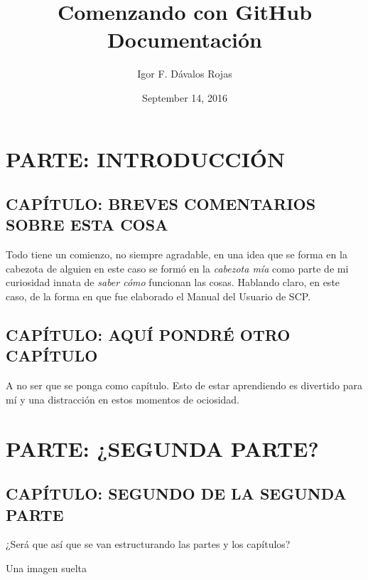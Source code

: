 \documentclass[letterpaper,10pt,english]{sphinxmanual}
\title{Comenzando con GitHub Documentación}
\date{September 14, 2016}
\author{Igor F. Dávalos Rojas}
\begin{document}
\maketitle
\tableofcontents
{}\label{index::doc}



\part{PARTE: INTRODUCCIÓN}
\label{introduccion:introduccion}\label{introduccion:parte-introduccion}\label{introduccion:welcome-to-comenzando-con-github-s-documentation}\label{introduccion::doc}

\chapter{CAPÍTULO: BREVES COMENTARIOS SOBRE ESTA COSA}
\label{introduccion:capitulo-breves-comentarios-sobre-esta-cosa}\label{introduccion:capitulo1}
Todo tiene un comienzo, no siempre agradable, en una idea que se forma en la cabezota de alguien
en este caso se formó en la \emph{cabezota mía} como parte de mi curiosidad innata de \emph{saber cómo} funcionan las cosas.
Hablando claro, en este caso, de la forma en que fue elaborado el Manual del Usuario de SCP.


\chapter{CAPÍTULO: AQUÍ PONDRÉ OTRO CAPÍTULO}
\label{introduccion:capitulo2}\label{introduccion:capitulo-aqui-pondre-otro-capitulo}
A no ser que se ponga como capítulo. Esto de estar aprendiendo es divertido para mí y una distracción en estos momentos de ociosidad.


\part{PARTE: ¿SEGUNDA PARTE?}
\label{introduccion:parte-segunda-parte}\label{introduccion:segundaparte}

\chapter{CAPÍTULO: SEGUNDO DE LA SEGUNDA PARTE}
\label{introduccion:capitulo-segundo-de-la-segunda-parte}\label{introduccion:capitulo1-2}
¿Será que así que se van estructurando las partes y los capítulos?

Una imagen suelta
\end{document}
